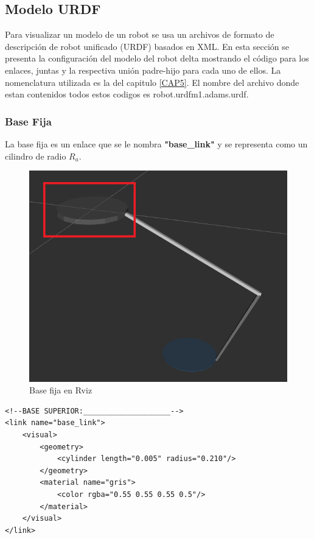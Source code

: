     \newpage
       
       
       
    \subsection{Modelo URDF}
        Para visualizar un modelo de un robot se usa un archivos de formato de descripción de robot unificado (URDF) basados en XML. En esta sección se presenta la configuración del modelo del robot delta mostrando el código para los enlaces, juntas y la respectiva unión padre-hijo para cada uno de ellos. La nomenclatura utilizada es la del capitulo \ref{CAP5}. El nombre del archivo donde estan contenidos todos estos codigos es robot.urdfm1.adams.urdf.  
        
       \subsubsection{Base Fija}
        La base fija es un enlace que se le nombra \textbf{"base\_link"} y se representa como un cilindro de radio \textbf{$R_a$}.

             \begin{figure}[h]
                \centering
                \includegraphics[width=0.6\linewidth]{Main/Chapter6/Images6/cap6_basefija.png}
                \caption{Base fija en Rviz}
                \label{f:Cap6_urdf_1}
            \end{figure}  


        \lstset{language=XML}
        \begin{lstlisting}
<!--BASE SUPERIOR:____________________-->
<link name="base_link">
	<visual>
		<geometry>
			<cylinder length="0.005" radius="0.210"/> 
		</geometry>
		<material name="gris">
			<color rgba="0.55 0.55 0.55 0.5"/>
		</material>
	</visual>
</link>
        \end{lstlisting}


